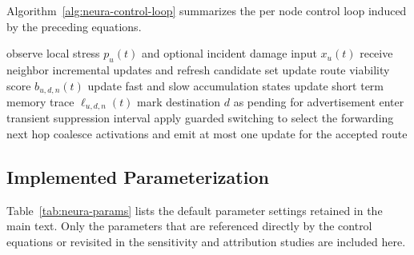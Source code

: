 \documentclass[5p,times]{elsarticle}
\begin{document}
Algorithm~\ref{alg:neura-control-loop} summarizes the per node control loop induced by the preceding equations.

\begin{algorithm}[t]
\caption{NEURA Localized Control Loop at Node $u$}
\label{alg:neura-control-loop}
\begin{algorithmic}[1]
    \State observe local stress $p_u(t)$ and optional incident damage input $x_u(t)$
    \State receive neighbor incremental updates and refresh candidate set
        \State update route viability score $b_{u,d,n}(t)$
        \State update fast and slow accumulation states
        \State update short term memory trace $\ell_{u,d,n}(t)$
            \State mark destination $d$ as pending for advertisement
            \State enter transient suppression interval
        \EndIf
    \EndFor
    \State apply guarded switching to select the forwarding next hop
        \State coalesce activations and emit at most one update for the accepted route
    \EndFor
\EndFor
\end{algorithmic}
\end{algorithm}

\subsection{Implemented Parameterization}

Table~\ref{tab:neura-params} lists the default parameter settings retained in the main text. Only the parameters that are referenced directly by the control equations or revisited in the sensitivity and attribution studies are included here.
\end{document}
